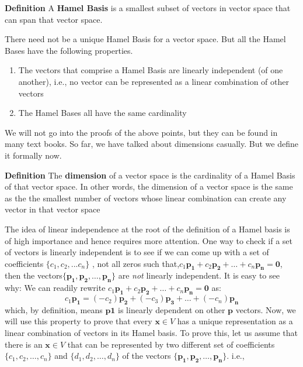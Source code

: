 	\begin{highlightedText}
	\textbf{Definition} A \textbf{Hamel Basis} is a smallest subset of vectors in vector space that can span that vector space.
	\end{highlightedText}

There need not be a unique Hamel Basis for a vector space. But all the Hamel Bases have the following properties.
	\begin{enumerate}
	\item The vectors that comprise a Hamel Basis are linearly independent (of one another), i.e., no vector can be represented as a linear combination of other vectors 
	\item The Hamel Bases all have the same cardinality
	\end{enumerate}
	
We will not go into the proofs of the above points, but they can be found in many text books. So far, we have talked about dimensions casually. But we define it formally now.

	\begin{highlightedText}
	\textbf{Definition} The \textbf{dimension} of a vector space is the cardinality of a Hamel Basis of that vector space. In other words, the dimension of a vector space is the same as the the smallest number of vectors whose linear combination can create any vector in that vector space
	\end{highlightedText}
	
The idea of linear independence at the root of the definition of a Hamel basis is of high importance and hence requires more attention. One way to check if a set of vectors is linearly independent is to see if we can come up with a set of coefficients \( \{c_1, c_2, ...c_n\} \) , not all zeros such that,\( c_1\mathbf{p_1} + c_2\mathbf{p_2} + \ldots + c_n\mathbf{p_n} = \mathbf{0} \), then the vectors\( \{ \mathbf{p_1}, \mathbf{p_2}, \ldots, \mathbf{p_n} \} \) are \emph{not} linearly independent. It is easy to see why: We can readily rewrite \( c_1\mathbf{p_1} + c_2\mathbf{p_2} + \ldots + c_n\mathbf{p_n} = \mathbf{0} \) as:
	\[ c_1\mathbf{p_1} =  (-c_2)\mathbf{p_2} + (-c_3)\mathbf{p_3} + \ldots + (-c_n)\mathbf{p_n} \]
which, by definition, means \(\mathbf{p1}\) is linearly dependent on other \(\mathbf{p}\) vectors. Now, we will use this property to prove that every \( \mathbf{x} \in V \) has a unique representation as a linear combination of vectors in its Hamel basis. To prove this, let us assume that there is an  \( \mathbf{x} \in V \) that can be represented by two different set of coefficients \( \{c_1, c_2, \ldots, c_n\} \) and \( \{d_1, d_2, \ldots, d_n\} \) of the vectors \( \{ \mathbf{p_1}, \mathbf{p_2}, \ldots, \mathbf{p_n} \} \). i.e., 

